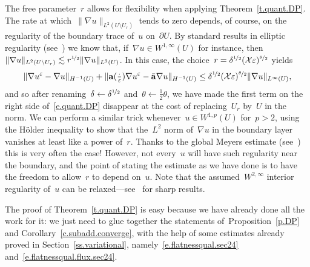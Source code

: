 \documentclass[11pt,twoside]{article} %
\numberwithin{equation}{section}
\theoremstyle{definition}
\newcommand{\eps}{\varepsilon}
\newcommand{\ep}{\eps}
\renewcommand{\a}{\mathbf{a}}
\newcommand{\ahom}{\bar{\a}}
\newcommand{\X}{\mathcal{X}}
\begin{document}
The free parameter~$r$ allows for flexibility when applying Theorem~\ref{t.quant.DP}. The rate at which~$\| \nabla u \|_{{L}^2(U \setminus U_r)}$ tends to zero depends, of course, on the regularity of the boundary trace of~$u$ on~$\partial U$. By standard results in elliptic regularity (see~\cite[Proposition B.16]{AKMBook}) we know that, if~$\nabla u \in W^{1,\infty}(U)$  for instance, then~$\| \nabla u \|_{{L}^2(U \setminus U_r)} \lesssim r^{\nicefrac12}\| \nabla u \|_{{L}^2(U)}$. In this case, the choice~$r = \delta^{\nicefrac12} (\X \ep)^{\nicefrac \theta2}$ yields 
\begin{equation*}
\| \nabla u^\ep - \nabla u \|_{H^{-1}(U)} 
+ 
\| \a(\tfrac \cdot \ep) \nabla u^\ep - \ahom \nabla u \|_{H^{-1}(U)} 
\leq
\delta^{\nicefrac12} 
(\X \ep)^{\nicefrac \theta 2}
\| \nabla u \|_{L^\infty(U)} ,
\end{equation*}
and so after renaming~$\delta \leftarrow \delta^{\nicefrac12}$ and~$\theta \leftarrow \frac12\theta$, we have made the first term on the right side of~\eqref{e.quant.DP} disappear at the cost of replacing~$U_r$ by~$U$ in the norm. 
We can perform a similar trick whenever~$u \in W^{1,p}(U)$ for~$p>2$, using the H\"older inequality to show that the~$L^2$ norm of~$\nabla u$ in the boundary layer vanishes at least like a power of~$r$. Thanks to the global Meyers estimate (see~\cite[Appendix C]{AKMBook}) this is very often the case! However, not every~$u$ will have such regularity near the boundary, and the point of stating the estimate as we have done is to have the freedom to allow~$r$ to depend on~$u$. 
Note that the assumed~$W^{2,\infty}$ interior regularity of~$u$ can be relaxed---see~\cite[Section 6.3]{AKMBook} for sharp results. 

\smallskip

The proof of Theorem~\ref{t.quant.DP} is easy because we have already done all the work for it: we just need to glue together the statements of~Proposition~\ref{p.DP} and Corollary~\ref{c.subadd.converge}, with the help of some estimates already proved in Section~\ref{ss.variational}, namely~\eqref{e.flatnessqual.sec24} and~\eqref{e.flatnessqual.flux.sec24}.
\end{document}
